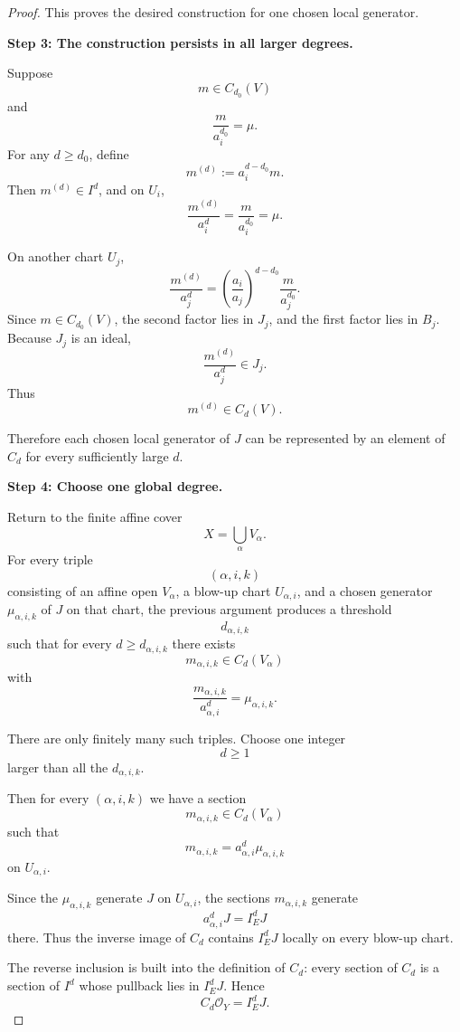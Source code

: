 \documentclass[11pt]{article}
\newcommand{\OO}{\mathcal O}
\begin{document}
\begin{proof}
This proves the desired construction for one chosen local generator.

\medskip

\noindent
\textbf{Step 3: The construction persists in all larger degrees.}

Suppose
\[
  m\in C_{d_0}(V)
\]
and
\[
  \frac{m}{a_i^{d_0}}=\mu.
\]
For any $d\geq d_0$, define
\[
  m^{(d)}
  :=
  a_i^{d-d_0}m.
\]
Then $m^{(d)}\in I^d$, and on $U_i$,
\[
  \frac{m^{(d)}}{a_i^d}
  =
  \frac{m}{a_i^{d_0}}
  =
  \mu.
\]

On another chart $U_j$,
\[
  \frac{m^{(d)}}{a_j^d}
  =
  \left(\frac{a_i}{a_j}\right)^{d-d_0}
  \frac{m}{a_j^{d_0}}.
\]
Since $m\in C_{d_0}(V)$, the second factor lies in $J_j$, and the first factor
lies in $B_j$.
Because $J_j$ is an ideal,
\[
  \frac{m^{(d)}}{a_j^d}\in J_j.
\]
Thus
\[
  m^{(d)}\in C_d(V).
\]

Therefore each chosen local generator of $J$ can be represented by an element
of $C_d$ for every sufficiently large $d$.

\medskip

\noindent
\textbf{Step 4: Choose one global degree.}

Return to the finite affine cover
\[
  X=\bigcup_\alpha V_\alpha.
\]
For every triple
\[
  (\alpha,i,k)
\]
consisting of an affine open $V_\alpha$, a blow-up chart
$U_{\alpha,i}$, and a chosen generator $\mu_{\alpha,i,k}$ of $J$ on that
chart, the previous argument produces a threshold
\[
  d_{\alpha,i,k}
\]
such that for every $d\geq d_{\alpha,i,k}$ there exists
\[
  m_{\alpha,i,k}\in C_d(V_\alpha)
\]
with
\[
  \frac{m_{\alpha,i,k}}{a_{\alpha,i}^d}
  =
  \mu_{\alpha,i,k}.
\]

There are only finitely many such triples.
Choose one integer
\[
  d\geq 1
\]
larger than all the $d_{\alpha,i,k}$.

Then for every $(\alpha,i,k)$ we have a section
\[
  m_{\alpha,i,k}\in C_d(V_\alpha)
\]
such that
\[
  m_{\alpha,i,k}
  =
  a_{\alpha,i}^d\mu_{\alpha,i,k}
\]
on $U_{\alpha,i}$.

Since the $\mu_{\alpha,i,k}$ generate $J$ on $U_{\alpha,i}$, the sections
$m_{\alpha,i,k}$ generate
\[
  a_{\alpha,i}^dJ
  =
  I_E^dJ
\]
there.
Thus the inverse image of $C_d$ contains $I_E^dJ$ locally on every blow-up
chart.

The reverse inclusion is built into the definition of $C_d$: every section
of $C_d$ is a section of $I^d$ whose pullback lies in $I_E^dJ$.
Hence
\[
  C_d\OO_Y=I_E^dJ.
\]

\medskip


\end{proof}
\end{document}
